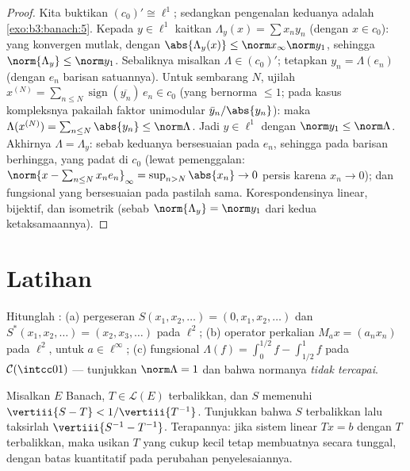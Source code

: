 \begin{proof}
Kita buktikan $(c_0)' \cong \ell^1$; sedangkan pengenalan keduanya adalah
\cref{exo:b3:banach:5}. Kepada $y \in \ell^1$ kaitkan $\Lambda_y(x)
= \sum x_ny_n$ (dengan $x \in c_0$): yang konvergen mutlak, dengan
$\abs{\Lambda_y(x)} \leq \norm x_\infty\norm y_1$, sehingga
$\norm{\Lambda_y} \leq \norm y_1$. Sebaliknya misalkan $\Lambda \in
(c_0)'$; tetapkan $y_n = \Lambda(e_n)$ (dengan $e_n$ barisan satuannya).
Untuk sembarang $N$, ujilah $x^{(N)} = \sum_{n \leq N}
\operatorname{sign}(\overline{y_n})\,e_n \in c_0$ (yang bernorma $\leq
1$; pada kasus kompleksnya pakailah faktor unimodular $\bar y_n/\abs
{y_n}$): maka $\Lambda(x^{(N)}) = \sum_{n\leq N}\abs{y_n} \leq
\norm\Lambda$. Jadi $y \in \ell^1$ dengan $\norm y_1 \leq
\norm\Lambda$. Akhirnya $\Lambda = \Lambda_y$: sebab keduanya bersesuaian pada
$e_n$, sehingga pada barisan berhingga, yang padat di $c_0$ (lewat pemenggalan:
$\norm{x - \sum_{n \leq N}x_ne_n}_\infty = \sup_{n > N}\abs{x_n}
\to 0$ persis karena $x_n \to 0$); dan fungsional 
yang bersesuaian pada  pastilah sama. Korespondensinya linear,
bijektif, dan isometrik (sebab $\norm{\Lambda_y} = \norm y_1$ dari
kedua ketaksamaannya).
\end{proof}

\section{Latihan}

\begin{exercise}[$\star$]\label{exo:b3:banach:1}
Hitunglah :
(a) pergeseran $S(x_1, x_2, \dots) = (0, x_1, x_2, \dots)$ dan
$S^*(x_1, x_2, \dots) = (x_2, x_3, \dots)$ pada $\ell^2$;
(b) operator perkalian $M_a x = (a_nx_n)$ pada $\ell^2$,
untuk $a \in \ell^\infty$;
(c) fungsional $\Lambda(f) = \int_0^{1/2}f -
\int_{1/2}^1f$ pada $\mathcal C(\intcc01)$ --- tunjukkan
$\norm\Lambda = 1$ dan bahwa normanya \emph{tidak tercapai}.
\end{exercise}

\begin{exercise}[$\star$]\label{exo:b3:banach:2}
Misalkan $E$ Banach, $T \in \mathcal L(E)$ terbalikkan, dan $S$
memenuhi $\vertiii{S - T} < 1/\vertiii{T^{-1}}$. Tunjukkan bahwa $S$
terbalikkan lalu taksirlah $\vertiii{S^{-1} - T^{-1}}$. Terapannya:
jika sistem linear $Tx = b$  dengan $T$ terbalikkan, maka
usikan $T$ yang cukup kecil tetap membuatnya  secara
tunggal, dengan batas kuantitatif pada perubahan penyelesaiannya.
\end{exercise}

